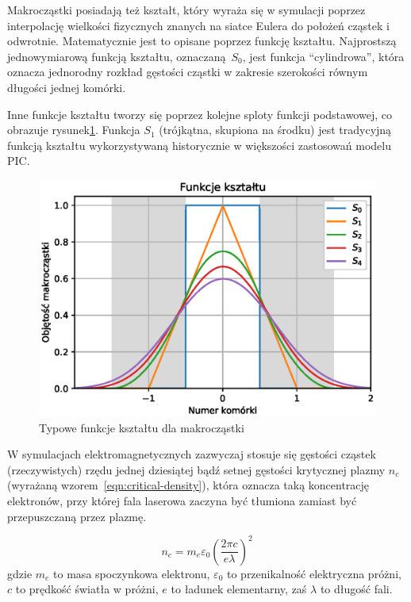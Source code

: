     Makrocząstki posiadają też kształt, który wyraża się w symulacji poprzez
    interpolację wielkości fizycznych znanych na siatce Eulera do położeń
    cząstek i odwrotnie. Matematycznie jest to opisane poprzez funkcję kształtu.
    Najprostszą jednowymiarową funkcją kształtu, oznaczaną $S_0$, jest funkcja
    ``cylindrowa'', która oznacza jednorodny rozkład gęstości cząstki w zakresie
    szerokości równym długości jednej komórki.
    
    Inne funkcje kształtu tworzy się poprzez kolejne sploty funkcji podstawowej,
    co obrazuje rysunek\ref{fig:shapefunctions}. Funkcja $S_1$ (trójkątna,
    skupiona na środku) jest tradycyjną funkcją kształtu wykorzystywaną
    historycznie w większości zastosowań modelu PIC\@.


    \begin{figure}[h!]
      \includegraphics{Images/shapefunctions}
      \caption{Typowe funkcje kształtu dla makrocząstki\label{fig:shapefunctions}} 
    \end{figure}

    W symulacjach elektromagnetycznych zazwyczaj stosuje się
    gęstości cząstek (rzeczywistych) rzędu jednej dziesiątej bądź setnej
    gęstości krytycznej plazmy $n_c$ (wyrażaną wzorem~\ref{eqn:critical-density}),
    która oznacza taką koncentrację
    elektronów, przy której fala laserowa zaczyna być tłumiona zamiast być
    przepuszczaną przez plazmę.\cite{chen}

    \begin{equation}
        n_c = m_e \varepsilon_0 {(\frac{2 \pi c}{e \lambda})}^2
        \label{eqn:critical-density}
    \end{equation}
    gdzie $m_e$ to masa spoczynkowa elektronu, $\varepsilon_0$ to przenikalność
    elektryczna próżni, $c$ to prędkość światła w
    próżni, $e$ to ładunek elementarny, zaś $\lambda$ to długość fali.

